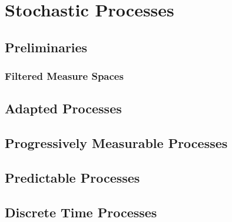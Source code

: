 ﻿%

\chapter{Stochastic Processes}\label{chapter:stochastic_processes}

\section{Preliminaries}
\subsection{Filtered Measure Spaces}
\section{Adapted Processes}
\section{Progressively Measurable Processes}
\section{Predictable Processes}

\section{Discrete Time Processes}
